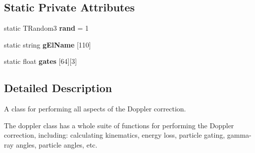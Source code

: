 \subsection*{Static Private Attributes}
\begin{DoxyCompactItemize}
\item 
\hypertarget{classdoppler_aae9abccd585d661865d248898d74bbd2}{static T\-Random3 {\bfseries rand} = 1}\label{classdoppler_aae9abccd585d661865d248898d74bbd2}

\item 
\hypertarget{classdoppler_a952dcea91ca4181a84b76d65ba20457d}{static string {\bfseries g\-El\-Name} \mbox{[}110\mbox{]}}\label{classdoppler_a952dcea91ca4181a84b76d65ba20457d}

\item 
\hypertarget{classdoppler_a079fe638004583658e9d1ca6f5b92fc1}{static float {\bfseries gates} \mbox{[}64\mbox{]}\mbox{[}3\mbox{]}}\label{classdoppler_a079fe638004583658e9d1ca6f5b92fc1}

\end{DoxyCompactItemize}


\subsection{Detailed Description}
A class for performing all aspects of the Doppler correction. 

The doppler class has a whole suite of functions for performing the Doppler correction, including\-: calculating kinematics, energy loss, particle gating, gamma-\/ray angles, particle angles, etc. 

